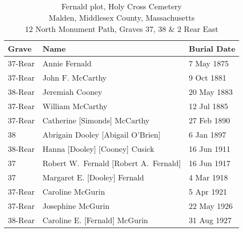 \begin{table}[ht]
	\centering
	\caption{Fernald plot, Holy Cross Cemetery\cite{HolyCrossPlotFernald} \\
		Malden, Middlesex County, Massachusetts\\
		12 North Monument Path, Graves 37, 38 \& 2 Rear East}
	\begin{tabular}{|l|l|l|}
		\hline
		\textbf{Grave} & \textbf{Name} & \textbf{Burial Date} \\
		\hline
		37-Rear & Annie Fernald\index{Fernald!Anna\textsuperscript{4}} & 7 May 1875 \\ \hline
		37-Rear & John F. McCarthy\index{McCarthy!John F.\textsuperscript{5}} & 9 Oct 1881 \\ \hline
		38-Rear & Jeremiah Cooney\index{Cooney!Jeremiah} & 20 May 1883 \\ \hline
		37-Rear & William McCarthy\index{McCarthy!William\textsuperscript{5}} & 12 Jul 1885 \\ \hline
		37-Rear & Catherine [Simonds] McCarthy\index{Simonds!Catharine\textsuperscript{4}}\index{McCarthy!Catharine\textsuperscript{4} (Simonds)} & 27 Feb 1890 \\ \hline
		38 & Abrigain Dooley [Abigail O'Brien]\index{O'Brien!Abigail\textsuperscript{2}}\index{Dooley!Abigail\textsuperscript{2} (O'Brien)} & 6 Jan 1897 \\ \hline
		38-Rear & Hanna [Dooley] [Cooney] Cusick\index{Dooley!Hannah/Hanora\textsuperscript{3}}\index{Cooney!Hannah/Hanora\textsuperscript{3} (Dooley)}\index{Cusick!Hannah/Hanora\textsuperscript{3} (Dooley) (Cooney)} & 16 Jun 1911 \\ \hline
		37 & Robert W.\ Fernald [Robert A.\ Fernald]\index{Fernald!Robert} & 16 Jun 1917 \\ \hline
		37 & Margaret E. [Dooley] Fernald\index{Dooley!Margaret\textsuperscript{3}}\index{Fernald!Margaret\textsuperscript{3} (Dooley) (Simonds)}\index{Simonds!Margaret\textsuperscript{3} (Dooley)} & 4 Mar 1918 \\ \hline
		37-Rear & Caroline McGurin\index{McGurin!Caroline Josephine\textsuperscript{5}} & 5 Apr 1921 \\ \hline
		37-Rear & Josephine McGurin\index{McGurin!Josephine\textsuperscript{5}} & 22 May 1926 \\ \hline
		38-Rear & Caroline E. [Fernald] McGurin\index{Fernald!Caroline Emma\textsuperscript{4}}\index{McGurin!Caroline Emma\textsuperscript{4} (Fernald)} & 31 Aug 1927 \\ \hline

\end{tabular}
\end{table}
